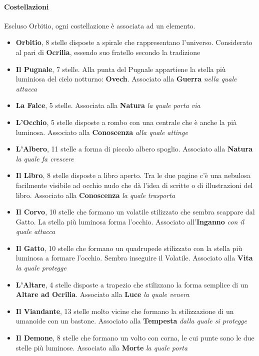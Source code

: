 \documentclass[10pt,twoside,onecolumn,openany]{book}
\begin{document}
\paragraph{Costellazioni} Escluso Orbitio, ogni costellazione è associata ad un elemento.
\begin{multicols}{2}
\begin{itemize}
\item \textbf{Orbitio}, 8 stelle disposte a spirale che rappresentano l'universo. Considerato al pari di \textbf{Ocrilia}, essendo suo fratello secondo la tradizione
\item \textbf{Il Pugnale}, 7 stelle. Alla punta del Pugnale appartiene la stella più luminiosa del cielo notturno: \textbf{Ovech}. Associato alla \textbf{Guerra} \textit{nella quale attacca}
\item \textbf{La Falce}, 5 stelle. Associata alla \textbf{Natura} \textit{la quale porta via}
\item \textbf{L'Occhio}, 5 stelle disposte a rombo con una centrale che è anche la pià luminosa. Associato alla \textbf{Conoscenza} \textit{alla quale attinge}
\item \textbf{L'Albero}, 11 stelle a forma di piccolo albero spoglio. Associato alla \textbf{Natura} \textit{la quale fa crescere}
\item \textbf{Il Libro}, 8 stelle disposte a libro aperto. Tra le due pagine c'è una nebulosa facilmente visibile ad occhio nudo che dà l'idea di scritte o di illustrazioni del libro. Associato alla \textbf{Conoscenza} \textit{la quale trasporta}
\item \textbf{Il Corvo}, 10 stelle che formano un volatile stilizzato che sembra scappare dal Gatto. La stella più luminosa forma l'occhio. Associato all'\textbf{Inganno} \textit{con il quale attacca}
\item \textbf{Il Gatto}, 10 stelle che formano un quadrupede stilizzato con la stella più luminosa a formare l'occhio. Sembra inseguire il Volatile. Associato alla \textbf{Vita} \textit{la quale protegge}
\item \textbf{L'Altare}, 4 stelle disposte a trapezio che stilizzano la forma semplice di un \textbf{Altare ad Ocrilia}. Associato alla \textbf{Luce} \textit{la quale venera}
\item \textbf{Il Viandante}, 13 stelle molto vicine che formano la stilizzazione di un umanoide con un bastone. Associato alla \textbf{Tempesta} \textit{dalla quale si protegge}
\item \textbf{Il Demone}, 8 stelle che formano un volto con corna, le cui punte sono le due stelle più luminose. Associato alla \textbf{Morte} \textit{la quale porta}

\end{itemize}
\end{multicols}
\end{document}
